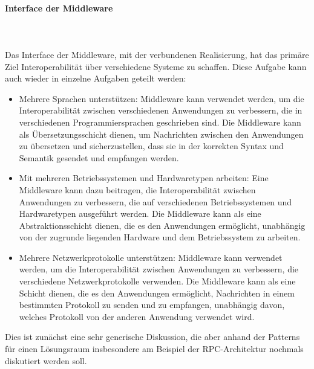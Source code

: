 \documentclass[../vs-script-first-v01.tex]{subfiles}
\begin{document}

\paragraph{Interface der Middleware}\mbox{}\\\\
Das Interface der Middleware, mit der verbundenen Realisierung, hat das primäre Ziel Interoperabilität über verschiedene Systeme zu schaffen. Diese Aufgabe kann auch wieder in einzelne Aufgaben geteilt werden: 
\begin{itemize}
\item Mehrere Sprachen unterstützen: Middleware kann verwendet werden, um die Interoperabilität zwischen verschiedenen Anwendungen zu verbessern, die in verschiedenen Programmiersprachen geschrieben sind. Die Middleware kann als Übersetzungsschicht dienen, um Nachrichten zwischen den Anwendungen zu übersetzen und sicherzustellen, dass sie in der korrekten Syntax und Semantik gesendet und empfangen werden.
\item Mit mehreren Betriebssystemen und Hardwaretypen arbeiten: Eine Middleware kann dazu beitragen, die Interoperabilität zwischen Anwendungen zu verbessern, die auf verschiedenen Betriebssystemen und Hardwaretypen ausgeführt werden. Die Middleware kann als eine Abstraktionsschicht dienen, die es den Anwendungen ermöglicht, unabhängig von der zugrunde liegenden Hardware und dem Betriebssystem zu arbeiten.
\item Mehrere Netzwerkprotokolle unterstützen: Middleware kann verwendet werden, um die Interoperabilität zwischen Anwendungen zu verbessern, die verschiedene Netzwerkprotokolle verwenden. Die Middleware kann als eine Schicht dienen, die es den Anwendungen ermöglicht, Nachrichten in einem bestimmten Protokoll zu senden und zu empfangen, unabhängig davon, welches Protokoll von der anderen Anwendung verwendet wird.
\end{itemize}
Dies ist zunächst eine sehr generische Diskussion, die aber anhand der Patterns für einen Lösungsraum insbesondere am Beispiel der RPC-Architektur nochmals diskutiert werden soll. 
\end{document}
